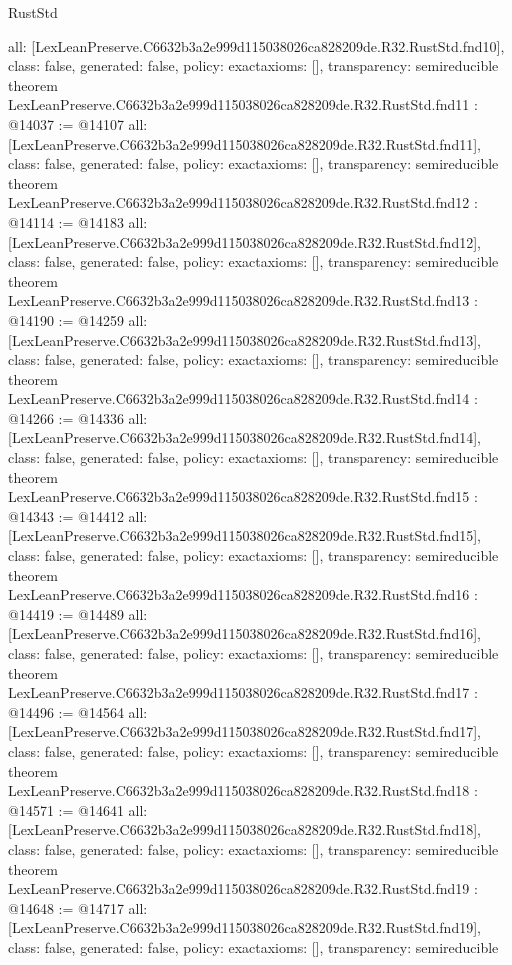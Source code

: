 \begin{lexlean}{RustStd}
\begin{coremodule}
{  all: [LexLeanPreserve.C6632b3a2e999d115038026ca828209de.R32.RustStd.fnd10],
  class: false,
  generated: false,
  policy: exact{axioms: []},
  transparency: semireducible
}
theorem LexLeanPreserve.C6632b3a2e999d115038026ca828209de.R32.RustStd.fnd11 : @14037 := @14107 {
  all: [LexLeanPreserve.C6632b3a2e999d115038026ca828209de.R32.RustStd.fnd11],
  class: false,
  generated: false,
  policy: exact{axioms: []},
  transparency: semireducible
}
theorem LexLeanPreserve.C6632b3a2e999d115038026ca828209de.R32.RustStd.fnd12 : @14114 := @14183 {
  all: [LexLeanPreserve.C6632b3a2e999d115038026ca828209de.R32.RustStd.fnd12],
  class: false,
  generated: false,
  policy: exact{axioms: []},
  transparency: semireducible
}
theorem LexLeanPreserve.C6632b3a2e999d115038026ca828209de.R32.RustStd.fnd13 : @14190 := @14259 {
  all: [LexLeanPreserve.C6632b3a2e999d115038026ca828209de.R32.RustStd.fnd13],
  class: false,
  generated: false,
  policy: exact{axioms: []},
  transparency: semireducible
}
theorem LexLeanPreserve.C6632b3a2e999d115038026ca828209de.R32.RustStd.fnd14 : @14266 := @14336 {
  all: [LexLeanPreserve.C6632b3a2e999d115038026ca828209de.R32.RustStd.fnd14],
  class: false,
  generated: false,
  policy: exact{axioms: []},
  transparency: semireducible
}
theorem LexLeanPreserve.C6632b3a2e999d115038026ca828209de.R32.RustStd.fnd15 : @14343 := @14412 {
  all: [LexLeanPreserve.C6632b3a2e999d115038026ca828209de.R32.RustStd.fnd15],
  class: false,
  generated: false,
  policy: exact{axioms: []},
  transparency: semireducible
}
theorem LexLeanPreserve.C6632b3a2e999d115038026ca828209de.R32.RustStd.fnd16 : @14419 := @14489 {
  all: [LexLeanPreserve.C6632b3a2e999d115038026ca828209de.R32.RustStd.fnd16],
  class: false,
  generated: false,
  policy: exact{axioms: []},
  transparency: semireducible
}
theorem LexLeanPreserve.C6632b3a2e999d115038026ca828209de.R32.RustStd.fnd17 : @14496 := @14564 {
  all: [LexLeanPreserve.C6632b3a2e999d115038026ca828209de.R32.RustStd.fnd17],
  class: false,
  generated: false,
  policy: exact{axioms: []},
  transparency: semireducible
}
theorem LexLeanPreserve.C6632b3a2e999d115038026ca828209de.R32.RustStd.fnd18 : @14571 := @14641 {
  all: [LexLeanPreserve.C6632b3a2e999d115038026ca828209de.R32.RustStd.fnd18],
  class: false,
  generated: false,
  policy: exact{axioms: []},
  transparency: semireducible
}
theorem LexLeanPreserve.C6632b3a2e999d115038026ca828209de.R32.RustStd.fnd19 : @14648 := @14717 {
  all: [LexLeanPreserve.C6632b3a2e999d115038026ca828209de.R32.RustStd.fnd19],
  class: false,
  generated: false,
  policy: exact{axioms: []},
  transparency: semireducible
}
\end{coremodule}
\end{lexlean}
